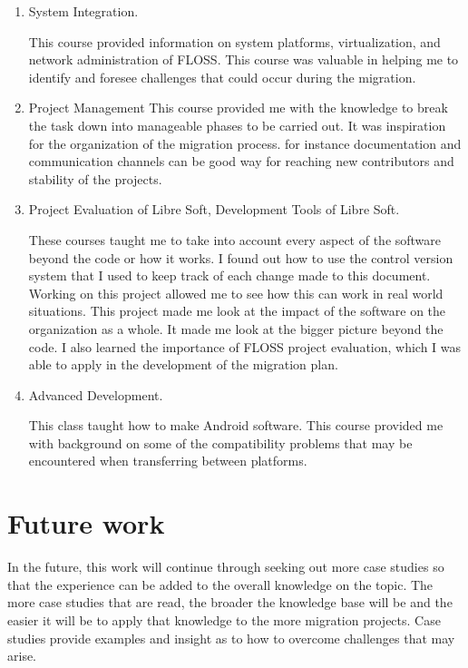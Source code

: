 \begin{enumerate}
 \item System Integration. 
 
 This course provided information on system platforms, virtualization, and network administration of FLOSS. This course was valuable in helping me to identify and foresee challenges that could occur during the migration.
 
\item Project Management 
This course provided me with the knowledge to break the task down into manageable phases to be carried out. It was inspiration for the organization of the migration process. for instance documentation and communication channels can be good way for reaching new contributors and stability of the projects. 

\item Project Evaluation of Libre Soft, Development Tools of Libre Soft.

These courses taught me to take into account every aspect of the software beyond the code or how it works. I found out how to use the control version system that I used to keep track of each change made to this document. Working on this project allowed me to see how this can work in real world situations. This project made me look at the impact of the software on the organization as a whole. It made me look at the bigger picture beyond the code.  I also learned the importance of FLOSS project evaluation, which I was able to apply in the development of the migration plan. 

\item Advanced Development. 

This class taught how to make Android software. This course  provided me with background on some of the compatibility problems that may be encountered when transferring between platforms.          

                                                                                               
	\end{enumerate}
\section{Future work}
\label{sec:future}
In the future, this work will continue through seeking out more case studies so that the experience can be added to the overall knowledge on the topic. The more case studies that are read, the broader the knowledge base will be and the easier it will be to apply that knowledge to the more migration projects. Case studies provide examples and insight as to how to overcome challenges that may arise. 

